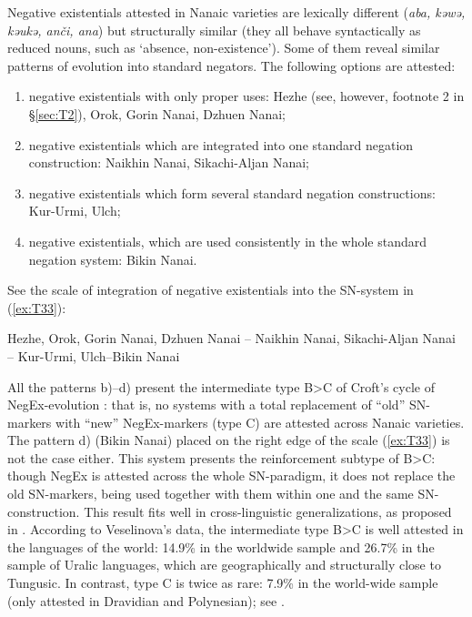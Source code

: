 \documentclass[output=paper,colorlinks,citecolor=brown]{langscibook}
\begin{document}
Negative existentials attested in Nanaic varieties are lexically different (\textit{aba, kəwə, kəukə, anči, ana}) but structurally similar (they all behave syntactically as reduced nouns, such as ‘absence, non-existence’). Some of them reveal similar patterns of evolution into standard negators. The following options are attested:

\begin{enumerate}[label=(\alph*)]
    \item negative existentials with only proper uses: Hezhe (see, however, footnote 2 in §\ref{sec:T2}), Orok, Gorin Nanai, Dzhuen Nanai;
    \item negative existentials which are integrated into one standard negation construction: Naikhin Nanai, Sikachi-Aljan Nanai;
    \item negative existentials which form several standard negation constructions: Kur-Urmi, Ulch;
    \item negative existentials, which are used consistently in the whole standard negation system: Bikin Nanai.
\end{enumerate}

See the scale of integration of negative existentials into the SN-system in (\ref{ex:T33}):

\begin{exe}
    \ex\label{ex:T33} Hezhe, Orok, Gorin Nanai, Dzhuen Nanai – Naikhin Nanai, Sikachi-Aljan Nanai – Kur-Urmi, Ulch–Bikin Nanai
\end{exe}

All the patterns b)–d) present the intermediate type B>C of Croft’s cycle of NegEx-evolution \citeyearpar{Croft1991}: that is, no systems with a total replacement of “old” SN-markers with “new” NegEx-markers (type C) are attested across Nanaic varieties. The pattern d) (Bikin Nanai) placed on the right edge of the scale (\ref{ex:T33}) is not the case either. This system presents the reinforcement subtype of B>C: though NegEx is attested across the whole SN-paradigm, it does not replace the old SN-markers, being used together with them within one and the same SN-construction. This result fits well in cross-linguistic generalizations, as proposed in \citet{Veselinova2016}. According to Veselinova’s data, the intermediate type B>C is well attested in the languages of the world: 14.9\% in the worldwide sample and 26.7\% in the sample of Uralic languages, which are geographically and structurally close to Tungusic. In contrast, type C is twice as rare: 7.9\% in the world-wide sample (only attested in Dravidian and Polynesian); see \citet[150]{Veselinova2016}.
\end{document}
